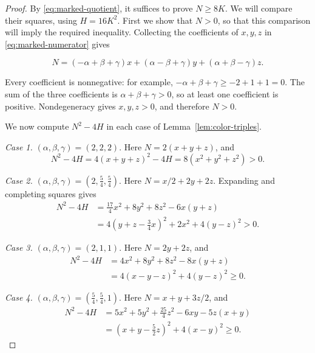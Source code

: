 \documentclass[11pt,a4paper]{article}
\theoremstyle{definition}
\theoremstyle{remark}
\begin{document}
\begin{proof}
By \eqref{eq:marked-quotient}, it suffices to prove $N\geq8K$.
We will compare their squares, using $H=16K^2$. First we show that
$N>0$, so that this comparison will imply the required inequality.
Collecting the coefficients of $x,y,z$ in
\eqref{eq:marked-numerator} gives

\begin{equation}
\label{eq:n-positive}
N=(-\alpha+\beta+\gamma)x
 +(\alpha-\beta+\gamma)y
 +(\alpha+\beta-\gamma)z.
\end{equation}

Every coefficient is nonnegative: for example,
$-\alpha+\beta+\gamma\geq-2+1+1=0$. The sum of the three
coefficients is $\alpha+\beta+\gamma>0$, so at least one coefficient is
positive. Nondegeneracy gives $x,y,z>0$, and therefore $N>0$.

We now compute $N^2-4H$ in each case of Lemma~\ref{lem:color-triples}.

\smallskip\noindent\emph{Case 1.} $(\alpha,\beta,\gamma)=(2,2,2)$.
Here $N=2(x+y+z)$, and
\begin{equation}
\label{eq:sos-222}
N^2-4H=4(x+y+z)^2-4H=8(x^2+y^2+z^2)>0.
\end{equation}

\smallskip\noindent\emph{Case 2.} $(\alpha,\beta,\gamma)=(2,\tfrac54,\tfrac54)$.
Here $N=x/2+2y+2z$. Expanding and completing squares gives
\begin{equation}
\label{eq:sos-255}
\begin{aligned}
N^2-4H
 &=\tfrac{17}{4}x^2+8y^2+8z^2-6x(y+z)\\
 &=4(y+z-\tfrac34x)^2+2x^2+4(y-z)^2>0.
\end{aligned}
\end{equation}

\smallskip\noindent\emph{Case 3.} $(\alpha,\beta,\gamma)=(2,1,1)$.
Here $N=2y+2z$, and
\begin{equation}
\label{eq:sos-211}
\begin{aligned}
N^2-4H
 &=4x^2+8y^2+8z^2-8x(y+z)\\
 &=4(x-y-z)^2+4(y-z)^2\geq0.
\end{aligned}
\end{equation}

\smallskip\noindent\emph{Case 4.} $(\alpha,\beta,\gamma)=(\tfrac54,\tfrac54,1)$.
Here $N=x+y+3z/2$, and
\begin{equation}
\label{eq:sos-551}
\begin{aligned}
N^2-4H
 &=5x^2+5y^2+\tfrac{25}{4}z^2-6xy-5z(x+y)\\
 &=(x+y-\tfrac52z)^2+4(x-y)^2\geq0.
\end{aligned}
\end{equation}


\end{proof}
\end{document}
